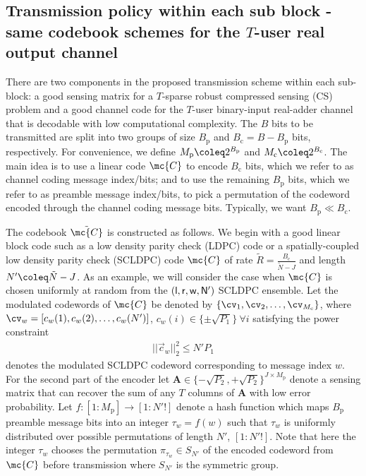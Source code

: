 \documentclass[final,onecolumn,12pt]{IEEEtran}
\begin{document}
\subsection{Transmission policy within each sub block - same codebook schemes for the $T$-user real output channel}
There are two components in the proposed transmission scheme within each sub-block: a good sensing matrix for a $T$-sparse robust compressed sensing (CS) problem and a good channel code for the $T$-user binary-input real-adder channel that is decodable with low computational complexity. The $B$ bits to be transmitted are split into two groups of size $B_{\mathrm{p}}$ and $B_{\mathrm{c}} = B-B_{\mathrm{p}}$ bits, respectively. For convenience, we define $M_{\mathrm{p}} \coleq 2^{B_{\mathrm{p}}}$ and $M_{\mathrm{c}} \coleq 2^{B_{\mathrm{c}}}$. The main idea is to use a linear code $\mc{C}$ to encode $B_{\mathrm{c}}$ bits, which we refer to as channel coding message index/bits; and to use the remaining $B_{\mathrm{p}}$ bits, which we refer to as preamble message index/bits, to pick a permutation of the codeword encoded through the channel coding message bits. Typically, we want $B_{\mathrm{p}} \ll B_{\mathrm{c}}$.

The codebook $\tilde{\mc{C}}$ is constructed as follows. We begin with a good linear block code such as a low density parity check (LDPC) code or a spatially-coupled low density parity check (SCLDPC) code $\mc{C}$ of rate $\tilde{R}=\frac{B_\mathrm{c}}{\tilde{N}-J}$ and length $N'\coleq \tilde{N}-J$. As an example, we will consider the case when $\mc{C}$ is chosen uniformly at random from the $(\sf{l,r,w},N')$ SCLDPC ensemble\cite{kudekar2011threshold}. Let the modulated codewords of ${\mc{C}}$ be denoted by $\{\cv_1,\cv_2,\ldots,\cv_{M_\mathrm{c}} \}$, where $\cv_{w} = [c_{w}(1),c_{w}(2),\ldots,c_{w}(N')]$,  $c_{w}(i)\in\{\pm\sqrt{P_1}\}~\forall i$ satisfying the power constraint
\begin{align}
||\vec{c}_w||_2^2\leq N'P_1
\label{eqn:mac_powerconstraint}
\end{align}
denotes the modulated SCLDPC codeword corresponding to message index $w$. For the second part of the encoder let $\mathbf{A}\in\{-\sqrt{P_2},+\sqrt{P_2}\}^{J\times M_\mathrm{p}}$ denote a sensing matrix that can recover the sum of any $T$ columns of $\mathbf{A}$ with low error probability. Let $f:[1:M_\mathrm{p}] \rightarrow [1:N'!]$ denote a hash function which maps $B_\mathrm{p}$  preamble message bits into an integer $\tau_w = f(w)$ such that $\tau_w$ is uniformly distributed over possible permutations of length $N'$, $[1:N'!]$. Note that here the integer $\tau_w$ chooses the permutation $\pi_{\tau_w}\in S_{N'}$ of the encoded codeword from $\mc{C}$ before transmission where $S_{N'}$ is the symmetric group.
\end{document}
